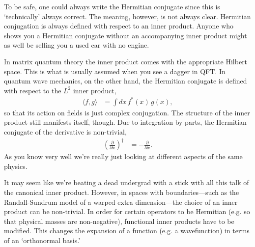 To be safe, one could always write the Hermitian conjugate since this is `technically' always correct. The meaning, however, is not always clear. Hermitian conjugation is always defined with respect to an inner product. Anyone who shows you a Hermitian conjugate without an accompanying inner product might as well be selling you a used car with no engine. 

In matrix quantum theory the inner product comes with the appropriate Hilbert space. This is what is usually assumed when you see a dagger in QFT. In quantum wave mechanics, on the other hand, the Hermitian conjugate is defined with respect to the $L^2$ inner product,
\begin{align}
    \langle f,g \rangle &= \int dx\, f^*(x)\,g(x),
\end{align}
so that its action on fields is just complex conjugation. The structure of the inner product still manifests itself, though. Due to integration by parts, the Hermitian conjugate of the derivative is non-trivial,
\begin{align}
    \left(\frac{\partial}{\partial x}\right)^\dag &= -\frac{\partial}{\partial x}.
\end{align}
As you know very well we're really just looking at different aspects of the same physics.
\begin{example}
It may seem like we're beating a dead undergrad with a stick with all this talk of the canonical inner product. However, in spaces with boundaries---such as the Randall-Sundrum model of a warped extra dimension---the choice of an inner product can be non-trivial. In order for certain operators to be Hermitian (e.g. so that physical masses are non-negative),  functional inner products have to be modified. This changes the expansion of a function (e.g. a wavefunction) in terms of an `orthonormal basis.'
\end{example}

